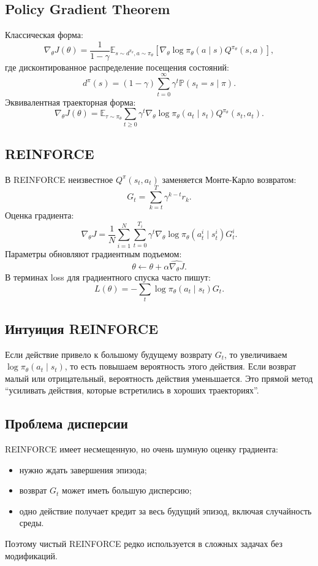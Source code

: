 \documentclass[11pt,a4paper]{article}
\newcommand{\E}{\mathbb{E}}
\renewcommand{\Prob}{\mathbb{P}}
\newcommand{\1}{\mathbf{1}}
\begin{document}
\subsection*{Policy Gradient Theorem}
Классическая форма:
\[
    \nabla_\theta J(\theta)=\frac1{1-\gamma}\E_{s\sim d^{\pi_\theta},a\sim\pi_\theta}\left[\nabla_\theta\log\pi_\theta(a\mid s)Q^{\pi_\theta}(s,a)\right],
\]
где дисконтированное распределение посещения состояний:
\[
    d^\pi(s)=(1-\gamma)\sum_{t=0}^\infty\gamma^t\Prob(s_t=s\mid\pi).
\]
Эквивалентная траекторная форма:
\[
    \nabla_\theta J(\theta)=\E_{\tau\sim\pi_\theta}\sum_{t\ge0}\gamma^t
    \nabla_\theta\log\pi_\theta(a_t\mid s_t)Q^{\pi_\theta}(s_t,a_t).
\]

\subsection*{REINFORCE}
В REINFORCE неизвестное $Q^\pi(s_t,a_t)$ заменяется Монте-Карло возвратом:
\[
    G_t=\sum_{k=t}^{T}\gamma^{k-t}r_k.
\]
Оценка градиента:
\[
    \widehat{\nabla_\theta J}=\frac1N\sum_{i=1}^N\sum_{t=0}^{T_i}\gamma^t
    \nabla_\theta\log\pi_\theta(a_t^i\mid s_t^i)G_t^i.
\]
Параметры обновляют градиентным подъемом:
\[
    \theta\leftarrow\theta+\alpha\widehat{\nabla_\theta J}.
\]
В терминах loss для градиентного спуска часто пишут:
\[
    L(\theta)=-\sum_t \log\pi_\theta(a_t\mid s_t)G_t.
\]

\subsection*{Интуиция REINFORCE}
Если действие привело к большому будущему возврату $G_t$, то увеличиваем $\log\pi_\theta(a_t\mid s_t)$, то есть повышаем вероятность этого действия. Если возврат малый или отрицательный, вероятность действия уменьшается. Это прямой метод ``усиливать действия, которые встретились в хороших траекториях''.

\subsection*{Проблема дисперсии}
REINFORCE имеет несмещенную, но очень шумную оценку градиента:
\begin{itemize}
    \item нужно ждать завершения эпизода;
    \item возврат $G_t$ может иметь большую дисперсию;
    \item одно действие получает кредит за весь будущий эпизод, включая случайность среды.
\end{itemize}
Поэтому чистый REINFORCE редко используется в сложных задачах без модификаций.
\end{document}
